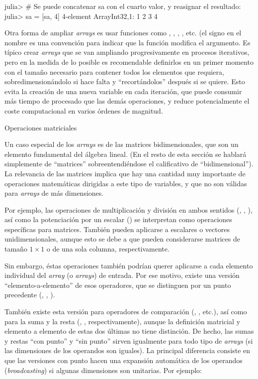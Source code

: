 ﻿\documentclass[spanish]{article}
\begin{document}
julia> # Se puede concatenar sa con el cuarto valor, y reasignar el resultado:
julia> sa = [sa, 4]
4-element Array{Int32,1}:
 1 2 3 4

Otra forma de ampliar \emph{arrays} es usar funciones como , , , , etc. (el signo \code{!} en el nombre es una convención para indicar que la función modifica el argumento. Es típico crear \emph{arrays} que se van ampliando progresivamente en procesos iterativos, pero en la medida de lo posible es recomendable definirlos en un primer momento con el tamaño necesario para contener todos los elementos que requiera, sobredimensionándolo si hace falta y ``recortándolos'' después si se quiere. Esto evita la creación de una nueva variable en cada iteración, que puede consumir más tiempo de procesado que las demás operaciones, y reduce potencialmente el coste computacional en varios órdenes de magnitud.

Operaciones matriciales

Un caso especial de los \emph{arrays} es de las matrices bidimensionales, que son un elemento fundamental del álgebra lineal. (En el resto de esta sección se hablará simplemente de ``matrices'' sobreentendiéndose el calificativo de ``bidimensional''). La relevancia de las matrices implica que hay una cantidad muy importante de operaciones matemáticas dirigidas a este tipo de variables, y que no son válidas para \emph{arrays} de más dimensiones.

Por ejemplo, las operaciones de multiplicación y división en ambos sentidos (\code{*}, \code{/}, \code{\\} ), así como la potenciación por un escalar (\code{^}) se interpretan como operaciones específicas para matrices. También pueden aplicarse a escalares o vectores unidimensionales, aunque esto se debe a que pueden considerarse matrices de tamaño $1\times{}1$ o de una sola columna, respectivamente.

Sin embargo, éstas operaciones también podrían querer aplicarse a cada elemento individual del \emph{array} (o \emph{arrays}) de entrada. Por ese motivo, existe una versión ``elemento-a-elemento'' de esos operadores, que se distinguen por un punto precedente (, , ).

También existe esta versión para operadores de comparación (, , etc.), así como para  la suma y la resta (, , respectivamente), aunque la definición matricial y elemento a elemento de estas dos últimas no tiene distinción. De hecho, las sumas y restas ``con punto'' y ``sin punto'' sirven igualmente para todo tipo de \emph{arrays} (si las dimensiones de los operandos son iguales). La principal diferencia consiste en que las versiones con punto hacen una expansión automática de los operandos (\emph{broadcasting}) si algunas dimensiones son unitarias. Por ejemplo:
\end{document}
